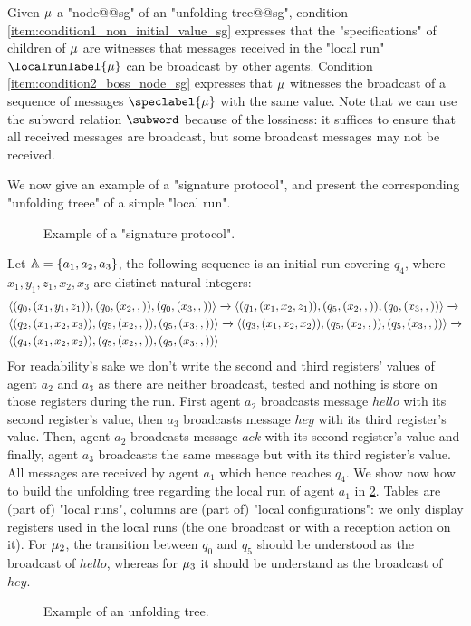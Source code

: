 Given $\mu$ a "node@@sg" of an "unfolding tree@@sg", condition \ref{item:condition1_non_initial_value_sg} expresses that the "specifications" of children of $\mu$ are witnesses that messages received in the "local run" $\localrunlabel{\node}$ can be broadcast by other agents. Condition \ref{item:condition2_boss_node_sg} expresses that $\mu$ witnesses the broadcast of a sequence of messages $\speclabel{\node}$ with the same value. Note that we can use the subword relation $\subword$ because of the lossiness: it suffices to ensure that all received messages are broadcast, but some broadcast messages may not be received.  

\begin{example}
	We now give an example of a "signature protocol", and present the corresponding "unfolding treee" of a simple "local run". 
	\begin{figure}[t]
		
		\caption{Example of a "signature protocol".}\label{fig:ex2}
	\end{figure}
Let $\mathbb{A} = \{a_1, a_2,a_3\}$, the following sequence is an initial run covering $q_4$, where $x_1, y_1, z_1, x_2, x_3$ are distinct natural integers:
	\begin{align*}
		&\langle (q_0, (x_1,y_1,z_1)), (q_0, (x_2,,)) , (q_0, (x_3,,)) \rangle \xrightarrow{} \langle (q_1, (x_1,x_2,z_1)), (q_5,(x_2,,)) , (q_0, (x_3,,)) \rangle \xrightarrow{} \\ 
		&\langle (q_2, (x_1,x_2,x_3)), (q_5,(x_2,,)), (q_5, (x_3,,)) \rangle \xrightarrow{} \langle (q_3, (x_1,x_2,x_2)), (q_5,(x_2,,)), (q_5, (x_3,,)) \rangle \xrightarrow{} \\
		&\langle (q_4, (x_1,x_2,x_2)),(q_5,(x_2,,)), (q_5, (x_3,,)) \rangle 
	\end{align*}
	For readability's sake we don't write the second and third registers' values of agent $a_2$ and $a_3$ as there are neither broadcast, tested and nothing is store on those registers during the run.
	First agent $a_2$ broadcasts message $hello$ with its second register's value, then $a_3$ broadcasts message $hey$ with its third register's value. Then, agent $a_2$ broadcasts message $ack$ with its second register's value and finally, agent $a_3$ broadcasts the same message but with its third register's value.
	All messages are received by agent $a_1$ which hence reaches $q_4$.
	We show now how to build the unfolding tree regarding the local run of agent $a_1$ in \cref{fig:unfolding-tree-sign}. Tables are (part of) "local runs", columns are (part of) "local configurations": we only display registers used in the local runs (the one broadcast or with a reception action on it). For $\mu_2$, the transition between $q_0$ and $q_5$ should be understood as the broadcast of $hello$, whereas for $\mu_3$ it should be understand as the broadcast of $hey$.
	\begin{figure}[t]
		
		\caption{Example of an unfolding tree.}\label{fig:unfolding-tree-sign}
	\end{figure}



\end{example}
